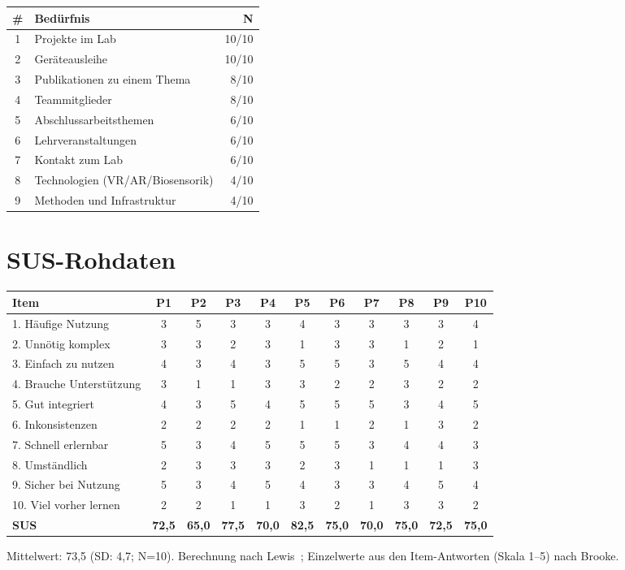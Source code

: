 {\tablecompact
\begin{tabularx}{\textwidth}{@{}c X r@{}}
\toprule
\textbf{\#} & \textbf{Bedürfnis} & \textbf{N} \\
\midrule
1 & Projekte im Lab & 10/10 \\
2 & Geräteausleihe & 10/10 \\
3 & Publikationen zu einem Thema & 8/10 \\
4 & Teammitglieder & 8/10 \\
5 & Abschlussarbeitsthemen & 6/10 \\
6 & Lehrveranstaltungen & 6/10 \\
7 & Kontakt zum Lab & 6/10 \\
8 & Technologien (VR/AR/Biosensorik) & 4/10 \\
9 & Methoden und Infrastruktur & 4/10 \\
\bottomrule
\end{tabularx}
}

\section{SUS-Rohdaten}
\label{app:sus}

{\scriptsize
\begin{tabularx}{\textwidth}{@{}X cccccccccc@{}}
\toprule
\textbf{Item} & \textbf{P1} & \textbf{P2} & \textbf{P3} & \textbf{P4} & \textbf{P5} & \textbf{P6} & \textbf{P7} & \textbf{P8} & \textbf{P9} & \textbf{P10} \\
\midrule
1. Häufige Nutzung & 3 & 5 & 3 & 3 & 4 & 3 & 3 & 3 & 3 & 4 \\
2. Unnötig komplex & 3 & 3 & 2 & 3 & 1 & 3 & 3 & 1 & 2 & 1 \\
3. Einfach zu nutzen & 4 & 3 & 4 & 3 & 5 & 5 & 3 & 5 & 4 & 4 \\
4. Brauche Unterstützung & 3 & 1 & 1 & 3 & 3 & 2 & 2 & 3 & 2 & 2 \\
5. Gut integriert & 4 & 3 & 5 & 4 & 5 & 5 & 5 & 3 & 4 & 5 \\
6. Inkonsistenzen & 2 & 2 & 2 & 2 & 1 & 1 & 2 & 1 & 3 & 2 \\
7. Schnell erlernbar & 5 & 3 & 4 & 5 & 5 & 5 & 3 & 4 & 4 & 3 \\
8. Umständlich & 2 & 3 & 3 & 3 & 2 & 3 & 1 & 1 & 1 & 3 \\
9. Sicher bei Nutzung & 5 & 3 & 4 & 5 & 4 & 3 & 3 & 4 & 5 & 4 \\
10. Viel vorher lernen & 2 & 2 & 1 & 1 & 3 & 2 & 1 & 3 & 3 & 2 \\
\midrule
\textbf{SUS} & \textbf{72,5} & \textbf{65,0} & \textbf{77,5} & \textbf{70,0} & \textbf{82,5} & \textbf{75,0} & \textbf{70,0} & \textbf{75,0} & \textbf{72,5} & \textbf{75,0} \\
\bottomrule
\end{tabularx}
}

\noindent Mittelwert: 73,5 (SD: 4,7; N=10). Berechnung nach Lewis~\cite{lewis2018}; Einzelwerte aus den Item-Antworten (Skala 1--5) nach Brooke.
